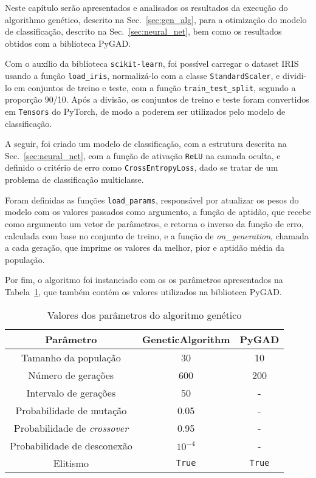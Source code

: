 Neste capítulo serão apresentados e analisados os resultados da execução do algorithmo genético, descrito na Sec.~\ref{sec:gen_alg}, para a otimização do modelo de classificação, descrito na Sec.~\ref{sec:neural_net}, bem como os resultados obtidos com a biblioteca PyGAD\@.

Com o auxílio da biblioteca \texttt{scikit-learn}, foi possível carregar o dataset IRIS usando a função \texttt{load\_iris}, normalizá-lo com a classe \texttt{StandardScaler}, e dividi-lo em conjuntos de treino e teste, com a função \texttt{train\_test\_split}, segundo a proporção 90/10.
Após a divisão, os conjuntos de treino e teste foram convertidos em \texttt{Tensors} do PyTorch, de modo a poderem ser utilizados pelo modelo de classificação.

A seguir, foi criado um modelo de classificação, com a estrutura descrita na Sec.~\ref{sec:neural_net}, com a função de ativação \texttt{ReLU} na camada oculta,
e definido o critério de erro como \texttt{CrossEntropyLoss}, dado se tratar de um problema de classificação multiclasse. 

Foram definidas as funções \texttt{load\_params}, responsável por atualizar os pesos do modelo com os valores passados como argumento, a função de aptidão, que recebe como argumento um vetor de parâmetros, e retorna o inverso da função de erro, calculada com base no conjunto de treino, e a função de \textit{on\_generation}, chamada a cada geração, que imprime os valores da melhor, pior e aptidão média da população.

Por fim, o algoritmo foi instanciado com os os parâmetros apresentados na Tabela~\ref{tab:ga_param_values}, que também contém os valores utilizados na biblioteca PyGAD\@.
\begin{table}[htbp]
    \centering
    \begin{tabular}{ccc}
        \hline
        \textbf{Parâmetro} & \textbf{GeneticAlgorithm} & \textbf{PyGAD} \\
        \hline
        Tamanho da população & 30 & 10 \\
        Número de gerações & 600 & 200 \\
        Intervalo de gerações & 50 & - \\
        Probabilidade de mutação & 0.05 & - \\
        Probabilidade de \textit{crossover} & 0.95 & - \\
        Probabilidade de desconexão & $10^{-4}$ & - \\
        Elitismo & \texttt{True} & \texttt{True} \\
        \hline
    \end{tabular}
    \caption{Valores dos parâmetros do algoritmo genético}
    \label{tab:ga_param_values}
\end{table}